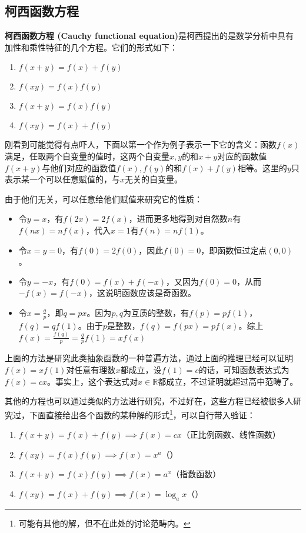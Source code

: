 \subsection{柯西函数方程}

\textbf{柯西函数方程 (Cauchy functional equation)}是柯西提出的是数学分析中具有加性和乘性特征的几个方程。它们的形式如下：
\begin{enumerate}
\item $f(x+y)=f(x)+f(y)$
\item $f(xy) = f(x) f(y)$
\item $f(x+y)=f(x)f(y)$
\item $f(xy) = f(x)+f(y)$
\end{enumerate}

刚看到可能觉得有点吓人，下面以第一个作为例子表示一下它的含义：函数$f(x)$满足，任取两个自变量的值时，这两个自变量$x,y$的和$x+y$对应的函数值$f(x+y)$与他们对应的函数值$f(x),f(y)$的和$f(x)+f(y)$相等。这里的$y$只表示某一个可以任意赋值的，与$x$无关的自变量。

由于他们无关，可以任意给他们赋值来研究它的性质：
\begin{itemize}
\item 令$y=x$，有$f(2x)=2f(x)$，进而更多地得到对自然数$n$有$f(nx)=nf(x)$，代入$x=1$有$f(n)=nf(1)$。
\item 令$x=y=0$，有$f(0)=2f(0)$，因此$f(0)=0$，即函数恒过定点$(0,0)$。
\item 令$y=-x$，有$f(0)=f(x)+f(-x)$，又因为$f(0)=0$，从而$-f(x)=f(-x)$，这说明函数应该是奇函数。
\item 令$\displaystyle x=\frac{q}{p}$，即$q=px$。因为$p,q$为互质的整数，有$f(p)=pf(1)$，$f(q)=qf(1)$。由于$p$是整数，$f(q)=f(px)=pf(x)$。综上$\displaystyle f(x)=\frac{f(q)}{p}=\frac{q}{p}f(1)=xf(x)$
\end{itemize}

上面的方法是研究此类抽象函数的一种普遍方法，通过上面的推理已经可以证明$f(x)=xf(1)$对任意有理数$x$都成立，设$f(1)=c$的话，可知函数表达式为$f(x)=cx$。事实上，这个表达式对$x\in\mathbb{R}$都成立，不过证明就超过高中范畴了。

其他的方程也可以通过类似的方法进行研究，不过好在，这些方程已经被很多人研究过，下面直接给出各个函数的某种解的形式\footnote{可能有其他的解，但不在此处的讨论范畴内。}，可以自行带入验证：

\begin{enumerate}
\item $f(x+y)=f(x)+f(y)\implies f(x)=cx$（正比例函数、线性函数）
\item $f(xy)=f(x)f(y)\implies f(x)=x^a$（）
\item $f(x+y)=f(x)f(y)\implies f(x)=a^x$（指数函数）
\item $f(xy)=f(x)+f(y)\implies f(x)=\log_ax$（）
\end{enumerate}

